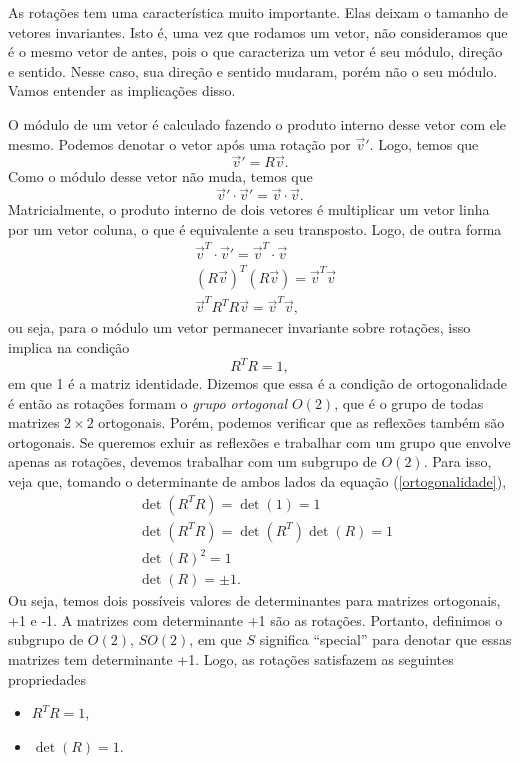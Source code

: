 \documentclass{article}
\numberwithin{equation}{section}
\numberwithin{figure}{section}
\begin{document}
As rotações tem uma característica muito importante. Elas deixam o tamanho de vetores invariantes. Isto é, uma vez que rodamos um vetor, não consideramos que é o mesmo vetor de antes, pois o que caracteriza um vetor é seu módulo, direção e sentido. Nesse caso, sua direção e sentido mudaram, porém não o seu módulo. Vamos entender as implicações disso. 

O módulo de um vetor é calculado fazendo o produto interno desse vetor com ele mesmo. Podemos denotar o vetor após uma rotação por $\vec{v}'$. Logo, temos que 
\begin{equation}
	\vec{v}'=R\vec{v}.
\end{equation} 
Como o módulo desse vetor não muda, temos que 
\begin{equation}
	\vec{v}'\cdot \vec{v}'=\vec{v}\cdot \vec{v}.
\end{equation}
Matricialmente, o produto interno de dois vetores é multiplicar um vetor linha por um vetor coluna, o que é equivalente a seu transposto. Logo, de outra forma 
\begin{equation*}
\begin{split}
		&\vec{v}^T\cdot \vec{v}'=\vec{v}^T\cdot\vec{v}\\
		&(R\vec{v})^T(R\vec{v})=\vec{v}^T\vec{v}\\
		&\vec{v}^TR^TR\vec{v}=\vec{v}^T\vec{v},
\end{split}
\end{equation*}
ou seja, para o módulo um vetor permanecer invariante sobre rotações, isso implica na condição 
\begin{equation}\label{ortogonalidade}
	R^TR=1,
\end{equation}
em que 1 é a matriz identidade. Dizemos que essa é a condição de ortogonalidade é então as rotações formam o \textit{grupo ortogonal $O(2)$}, que é o grupo de todas matrizes $2\times2$ ortogonais. Porém, podemos verificar que as reflexões também são ortogonais. Se queremos exluir as reflexões e trabalhar com um grupo que envolve apenas as rotações, devemos trabalhar com um subgrupo de $O(2)$. Para isso, veja que, tomando o determinante de ambos lados da equação (\ref{ortogonalidade}), 
\begin{equation*}
	\begin{split}
		&\det(R^TR)=\det(1)=1\\
		&\det(R^TR)=\det (R^T)\det (R)=1\\
		&\det(R)^2=1\\
		&\det(R)=\pm 1.
	\end{split}
\end{equation*}
Ou seja, temos dois possíveis valores de determinantes para matrizes ortogonais, +1 e -1. A matrizes com determinante +1 são as rotações. Portanto, definimos o subgrupo de $O(2)$, $SO(2)$, em que $S$ significa ``special'' para denotar que essas matrizes tem determinante +1. Logo, as rotações satisfazem as seguintes propriedades
\begin{itemize}
	\item $R^TR=1$,
	\item $\det(R)=1$.
\end{itemize}
\end{document}

